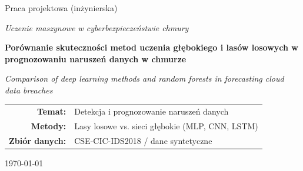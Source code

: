 \begin{titlepage}
\centering

\vspace*{1.5cm}
{\large Praca projektowa (inżynierska)\par}
\vspace{0.5cm}
{\large\itshape Uczenie maszynowe w cyberbezpieczeństwie chmury\par}

\vfill

{\Huge\bfseries Porównanie skuteczności metod uczenia głębokiego i lasów losowych w prognozowaniu naruszeń danych w chmurze\par}

\vspace{1.0cm}
{\large\itshape Comparison of deep learning methods and random forests in forecasting cloud data breaches\par}

\vfill

\begin{flushright}
\begin{tabular}{rl}
\textbf{Temat:} & Detekcja i prognozowanie naruszeń danych \\
\textbf{Metody:} & Lasy losowe vs. sieci głębokie (MLP, CNN, LSTM) \\
\textbf{Zbiór danych:} & CSE-CIC-IDS2018 / dane syntetyczne \\
\end{tabular}
\end{flushright}

\vfill

{\large \today\par}

\end{titlepage}
